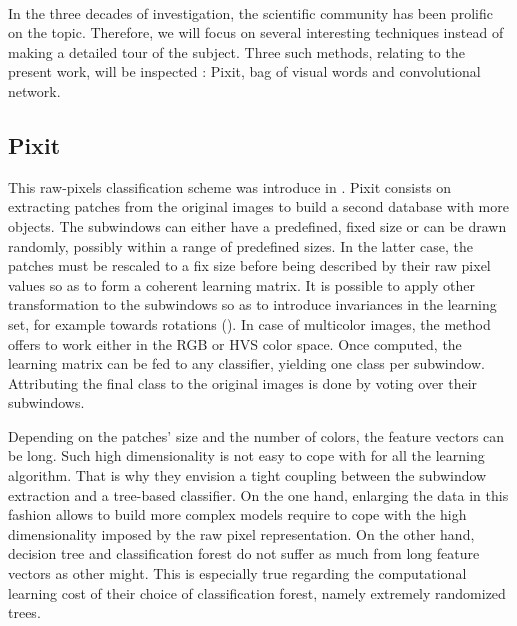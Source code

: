 \documentclass[a4paper]{report}
\newlength{\larg}
\begin{document}
\paragraph{}
In the three decades of investigation, the scientific community has been prolific on the topic. Therefore, we will focus on several interesting techniques instead of making a detailed tour of the subject.
Three such methods, relating to the present work, will be inspected : Pixit, bag of visual words and convolutional network.

\subsection{\label{subsec:Pixit}Pixit}
This raw-pixels classification scheme was introduce in \cite{pixit}. Pixit consists on extracting patches from the original images to build a second database with more objects. The subwindows can either have a predefined, fixed size or can be drawn randomly, possibly within a range of predefined sizes. In the latter case, the patches must be rescaled to a fix size before being described by their raw pixel values so as to form a coherent learning matrix. It is possible to apply other transformation to the subwindows so as to introduce invariances in the learning set, for example towards rotations (\cite{recapPixit}). In case of multicolor images, the method offers to work either in the RGB or HVS color space. 
Once computed, the learning matrix can be fed to any classifier, yielding one class per subwindow. Attributing the final class to the original images is done by voting over their subwindows.
\par
Depending on the patches' size and the number of colors, the feature vectors can be long. Such high dimensionality is not easy to cope with for all the learning algorithm. That is why they envision a tight coupling between the subwindow extraction and a tree-based classifier. On the one hand, enlarging the data in this fashion allows to build more complex models require to cope with the high dimensionality imposed by the raw pixel representation. On the other hand, decision tree and classification forest do not suffer as much from long feature vectors as other might. This is especially true regarding the computational learning cost of their choice of classification forest, namely extremely randomized trees.
\end{document}
